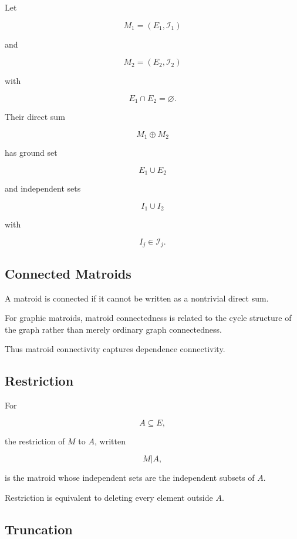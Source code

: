 Let

\[
M_1=(E_1,\mathcal{I}_1)
\]

and

\[
M_2=(E_2,\mathcal{I}_2)
\]

with

\[
E_1\cap E_2=\varnothing.
\]

Their direct sum

\[
\boxed{
M_1\oplus M_2
}
\]

has ground set

\[
E_1\cup E_2
\]

and independent sets

\[
I_1\cup I_2
\]

with

\[
I_j\in\mathcal{I}_j.
\]

\subsection{Connected Matroids}
\label{subsec:connected-matroids}

A matroid is connected if it cannot be written as a nontrivial direct
sum.

For graphic matroids, matroid connectedness is related to the cycle
structure of the graph rather than merely ordinary graph connectedness.

Thus matroid connectivity captures dependence connectivity.

\subsection{Restriction}
\label{subsec:matroid-restriction}

For

\[
A\subseteq E,
\]

the restriction of \(M\) to \(A\), written

\[
\boxed{
M|A,
}
\]

is the matroid whose independent sets are the independent subsets of
\(A\).

Restriction is equivalent to deleting every element outside \(A\).

\subsection{Truncation}
\label{subsec:matroid-truncation}

